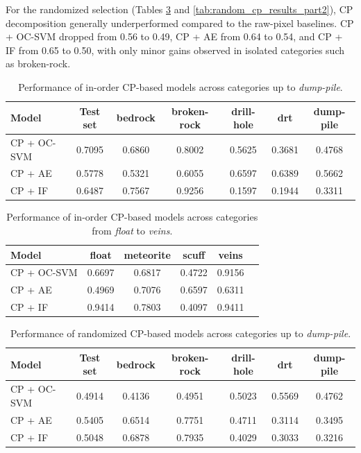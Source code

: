 \documentclass[11pt]{article}
\begin{document}
For the randomized selection (Tables \ref{tab:random_cp_results_part1} and \ref{tab:random_cp_results_part2}), CP decomposition generally underperformed compared to the raw-pixel baselines. CP + OC-SVM dropped from 0.56 to 0.49, CP + AE from 0.64 to 0.54, and CP + IF from 0.65 to 0.50, with only minor gains observed in isolated categories such as broken-rock.  

\begin{table}[h!]
\centering
\begin{tabular}{lcccccc}
\hline
\textbf{Model} & \textbf{Test set} & \textbf{bedrock} & \textbf{broken-rock} & \textbf{drill-hole} & \textbf{drt} & \textbf{dump-pile} \\
\hline
CP + OC-SVM & 0.7095 & 0.6860 & 0.8002 & 0.5625 & 0.3681 & 0.4768 \\
CP + AE     & 0.5778 & 0.5321 & 0.6055 & 0.6597 & 0.6389 & 0.5662 \\
CP + IF     & 0.6487 & 0.7567 & 0.9256 & 0.1597 & 0.1944 & 0.3311 \\
\hline
\end{tabular}
\caption{Performance of in-order CP-based models across categories up to \textit{dump-pile}.}
\label{tab:inOrder_cp_results_part1}
\end{table}

\begin{table}[h!]
\centering
\begin{tabular}{lccccc}
\hline
\textbf{Model} & \textbf{float} & \textbf{meteorite} & \textbf{scuff} & \textbf{veins} \\
\hline
CP + OC-SVM & 0.6697 & 0.6817 & 0.4722 & 0.9156 \\
CP + AE     & 0.4969 & 0.7076 & 0.6597 & 0.6311 \\
CP + IF     & 0.9414 & 0.7803 & 0.4097 & 0.9411 \\
\hline
\end{tabular}
\caption{Performance of in-order CP-based models across categories from \textit{float} to \textit{veins}.}
\label{tab:inOrder_cp_results_part2}
\end{table}

\begin{table}[h!]
\centering
\begin{tabular}{lcccccc}
\hline
\textbf{Model} & \textbf{Test set} & \textbf{bedrock} & \textbf{broken-rock} & \textbf{drill-hole} & \textbf{drt} & \textbf{dump-pile} \\
\hline
CP + OC-SVM & 0.4914 & 0.4136 & 0.4951 & 0.5023 & 0.5569 & 0.4762 \\
CP + AE     & 0.5405 & 0.6514 & 0.7751 & 0.4711 & 0.3114 & 0.3495 \\
CP + IF     & 0.5048 & 0.6878 & 0.7935 & 0.4029 & 0.3033 & 0.3216 \\
\hline
\end{tabular}
\caption{Performance of randomized CP-based models across categories up to \textit{dump-pile}.}
\label{tab:random_cp_results_part1}
\end{table}
\end{document}
